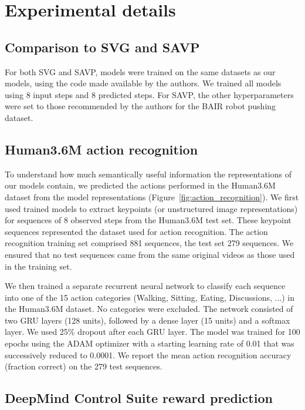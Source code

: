 \section{Experimental details}

\subsection{Comparison to SVG and SAVP}

For both SVG and SAVP, models were trained on the same datasets as our models, using the code made available by the authors. We trained all models using 8 input steps and 8 predicted steps. For SAVP, the other hyperparameters were set to those recommended by the authors for the BAIR robot pushing dataset.

\subsection{Human3.6M action recognition}\label{sup_sec:action_recognition}

To understand how much semantically useful information the representations of our models contain, we predicted the actions performed in the Human3.6M dataset from the model representations (Figure~\ref{fig:action_recognition}). We first used trained models to extract keypoints (or unstructured image representations) for sequences of 8 observed steps from the Human3.6M test set. These keypoint sequences represented the dataset used for action recognition. The action recognition training set comprised 881 sequences, the test set 279 sequences. We ensured that no test sequences came from the same original videos as those used in the training set.

We then trained a separate recurrent neural network to classify each sequence into one of the 15 action categories (Walking, Sitting, Eating, Discussions, ...) in the Human3.6M dataset. No categories were excluded. The network consisted of two GRU layers (128 units), followed by a dense layer (15 units) and a softmax layer. We used 25\% dropout after each GRU layer. The model was trained for 100 epochs using the ADAM optimizer with a starting learning rate of 0.01 that was successively reduced to 0.0001. We report the mean action recognition accuracy (fraction correct) on the 279 test sequences.

\subsection{DeepMind Control Suite reward prediction}\label{sup_sec:reward_prediction}

